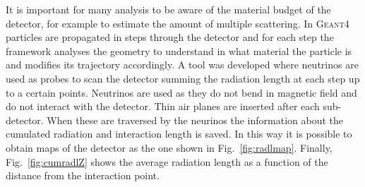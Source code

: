 It is important for many analysis to be aware of the material budget of the detector, for example to estimate
the amount of multiple scattering. In \textsc{Geant4} particles are propagated in steps
through the detector and for each step the framework analyses the geometry to understand in what material
the particle is and modifies its trajectory accordingly. A tool was developed where neutrinos are
used as probes to scan the detector summing the radiation length at each step up to a certain points.
Neutrinos are used as they do not bend in magnetic field and do not interact with the detector.
Thin air planes are inserted after each sub-detector. When these are traversed by the neurinos the information
about the cumulated radiation and interaction length is saved. In this way it is possible to obtain maps of
the detector as the one shown in Fig.~\ref{fig:radlmap}. Finally, Fig.~\ref{fig:cumradlZ} shows the average
radiation length as a function of the distance from the interaction point.


